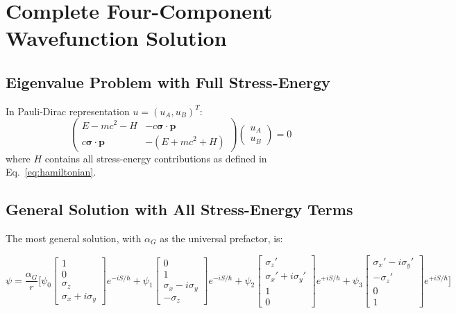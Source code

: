 \documentclass[11pt,a4paper]{article}
\theoremstyle{definition}
\theoremstyle{remark}
\begin{document}
	\section{Complete Four-Component Wavefunction Solution}
	
	\subsection{Eigenvalue Problem with Full Stress-Energy}
	
	In Pauli-Dirac representation $u=(u_A,u_B)^T$:
	\begin{equation}
		\begin{pmatrix} E-mc^2-H & -c\boldsymbol{\sigma}\cdot\mathbf{p} \\ c\boldsymbol{\sigma}\cdot\mathbf{p} & -(E+mc^2+H) \end{pmatrix}
		\begin{pmatrix} u_A \\ u_B \end{pmatrix} = 0
		\label{eq:coupled_system}
	\end{equation}
	where $H$ contains all stress-energy contributions as defined in Eq.~\eqref{eq:hamiltonian}.
	
	\subsection{General Solution with All Stress-Energy Terms}
	
	The most general solution, with $\alpha_G$ as the universal prefactor, is:
	
	\begin{equation}
		\psi = \frac{\alpha_G}{r}\Bigg[\psi_0\begin{bmatrix}1\\0\\\sigma_z\\\sigma_x+i\sigma_y\end{bmatrix}e^{-iS/\hbar}
		+ \psi_1\begin{bmatrix}0\\1\\\sigma_x-i\sigma_y\\-\sigma_z\end{bmatrix}e^{-iS/\hbar}
		+ \psi_2\begin{bmatrix}\sigma_z'\\\sigma_x'+i\sigma_y'\\1\\0\end{bmatrix}e^{+iS/\hbar}
		+ \psi_3\begin{bmatrix}\sigma_x'-i\sigma_y'\\-\sigma_z'\\0\\1\end{bmatrix}e^{+iS/\hbar}\Bigg]
		\label{eq:complete_solution}
	\end{equation}
	
\end{document}
